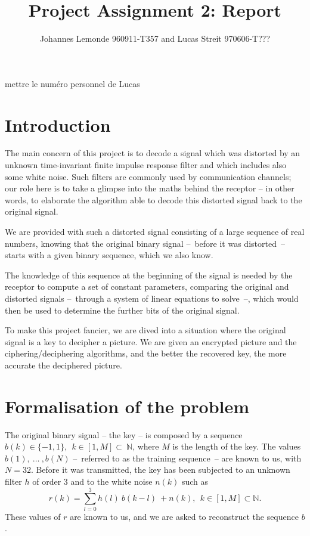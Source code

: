 \documentclass[twocolumn, 12pt]{IEEEtran}
\begin{document}
\title{Project Assignment 2: Report}
\author{Johannes Lemonde 960911-T357 and Lucas Streit 970606-T???}
mettre le numéro personnel de Lucas

\maketitle

\section{Introduction}

The main concern of this project is to decode a signal which was distorted by an unknown time-invariant finite impulse response filter and which includes also some white noise. Such filters are commonly used by communication channels; our role here is to take a glimpse into the maths behind the receptor -- in other words, to elaborate the algorithm able to decode this distorted signal back to the original signal.

We are provided with such a distorted signal consisting of a large sequence of real numbers, knowing that the original binary signal --~before it was distorted~-- starts with a given binary sequence, which we also know.

The knowledge of this sequence at the beginning of the signal is needed by the receptor to compute a set of constant parameters, comparing the original and distorted signals --~through a system of linear equations to solve~--, which would then be used to determine the further bits of the original signal.

To make this project fancier, we are dived into a situation where the original signal is a key to decipher a picture. We are given an encrypted picture and the ciphering/deciphering algorithms, and the better the recovered key, the more accurate the deciphered picture.

\section{Formalisation of the problem}

 The original binary signal -- the key -- is composed by a sequence ${b(k)\in \{-1,1\}}, ~~{k\in[1, M]\subset~\mathbb{N}}$, where $M$ is the length of the key.
 The values ${b(1),~\dots~, b(N)}$ --~referred to as the training sequence~-- are known to us, with ${N=32}$.
 Before it was transmitted, the key has been subjected to an unknown filter $h$ of order ${3}$ and to the white noise $n(k)$ such as 
 \begin{equation}\label{eq:r}
 { r(k) = \sum\limits_{l=0}^{3}h(l)~b(k-l)~+n(k),~~k\in[1,M]\subset\mathbb{N} }.
 \end{equation}
 These values of $r$ are known to us, and we are asked to reconstruct the sequence $b$.
 
\end{document}
